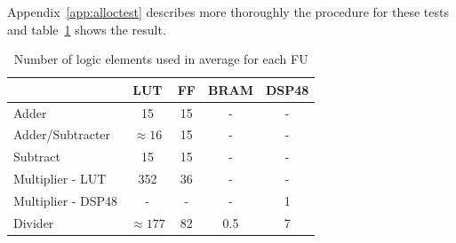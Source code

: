 Appendix~\vref{app:alloctest} describes more thoroughly the procedure for these tests and table~\ref{tab:utilizationofelements} shows the result.
\begin{table}[ht!]
\centering
\begin{tabular}{l | c c c c }
  \toprule
   &  LUT & FF & BRAM & DSP48 \\
  \midrule
  Adder & 15 & 15 & - & - \\
  Adder/Subtracter  & $\approx 16$ & 15 & - & - \\
  Subtract  & 15 &  15 & - & - \\
  Multiplier - LUT  & 352 &  36 & - & - \\
  Multiplier - DSP48 & - & - & - & 1 \\
  Divider & $\approx 177$ & 82 & 0.5 & 7 \\
  \bottomrule
\end{tabular}
\caption{Number of logic elements used in average for each FU}
\label{tab:utilizationofelements}
\end{table}
